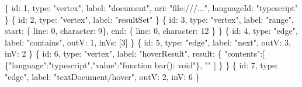\documentclass[
  a4paper,
  bibtex,
  english,
  nomenclature]{kthlatex/kththesis/kththesis}
\newenvironment{Shaded}{}{}
\newcommand{\BuiltInTok}[1]{#1}
\newcommand{\DecValTok}[1]{\textcolor[rgb]{0.25,0.63,0.44}{#1}}
\newcommand{\NormalTok}[1]{#1}
\newcommand{\StringTok}[1]{\textcolor[rgb]{0.25,0.44,0.63}{#1}}
\begin{document}
\begin{codelisting}

\caption{LSIF formated analysis result}

\hypertarget{lst:lsif-result-sample}{%
\label{lst:lsif-result-sample}}%
\begin{Shaded}
\begin{Highlighting}[]
\NormalTok{\{ }\BuiltInTok{id}\NormalTok{: }\DecValTok{1}\NormalTok{, }\BuiltInTok{type}\NormalTok{: }\StringTok{"vertex"}\NormalTok{, label: }\StringTok{"document"}\NormalTok{, uri: }\StringTok{"file:///..."}\NormalTok{, languageId: }\StringTok{"typescript"}\NormalTok{ \}}
\NormalTok{\{ }\BuiltInTok{id}\NormalTok{: }\DecValTok{2}\NormalTok{, }\BuiltInTok{type}\NormalTok{: }\StringTok{"vertex"}\NormalTok{, label: }\StringTok{"resultSet"}\NormalTok{ \}}
\NormalTok{\{ }
   \BuiltInTok{id}\NormalTok{: }\DecValTok{3}\NormalTok{, }
  \BuiltInTok{type}\NormalTok{: }\StringTok{"vertex"}\NormalTok{, }
\NormalTok{  label: }\StringTok{"range"}\NormalTok{,}
\NormalTok{  start: \{ line: }\DecValTok{0}\NormalTok{, character: }\DecValTok{9}\NormalTok{\}, }
\NormalTok{  end: \{ line: }\DecValTok{0}\NormalTok{, character: }\DecValTok{12}\NormalTok{ \} }
\NormalTok{\}}
\NormalTok{\{ }\BuiltInTok{id}\NormalTok{: }\DecValTok{4}\NormalTok{, }\BuiltInTok{type}\NormalTok{: }\StringTok{"edge"}\NormalTok{, label: }\StringTok{"contains"}\NormalTok{, outV: }\DecValTok{1}\NormalTok{, inVs: [}\DecValTok{3}\NormalTok{] \}}
\NormalTok{\{ }\BuiltInTok{id}\NormalTok{: }\DecValTok{5}\NormalTok{, }\BuiltInTok{type}\NormalTok{: }\StringTok{"edge"}\NormalTok{, label: }\StringTok{"next"}\NormalTok{, outV: }\DecValTok{3}\NormalTok{, inV: }\DecValTok{2}\NormalTok{ \}}
\NormalTok{\{ }
  \BuiltInTok{id}\NormalTok{: }\DecValTok{6}\NormalTok{, }
  \BuiltInTok{type}\NormalTok{: }\StringTok{"vertex"}\NormalTok{,}
\NormalTok{  label: }\StringTok{"hoverResult"}\NormalTok{,}
\NormalTok{  result: \{}
    \StringTok{"contents"}\NormalTok{:[}
\NormalTok{      \{}\StringTok{"language"}\NormalTok{:}\StringTok{"typescript"}\NormalTok{,}\StringTok{"value"}\NormalTok{:}\StringTok{"function bar(): void"}\NormalTok{\},}
      \StringTok{""}
\NormalTok{    ]}
\NormalTok{  \}}
\NormalTok{\}}
\NormalTok{\{ }\BuiltInTok{id}\NormalTok{: }\DecValTok{7}\NormalTok{, }\BuiltInTok{type}\NormalTok{: }\StringTok{"edge"}\NormalTok{, label: }\StringTok{"textDocument/hover"}\NormalTok{, outV: }\DecValTok{2}\NormalTok{, inV: }\DecValTok{6}\NormalTok{ \}}
\end{Highlighting}
\end{Shaded}

\end{codelisting}
\end{document}
